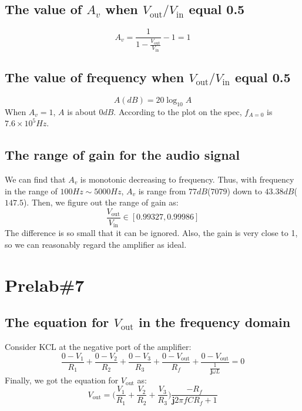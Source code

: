 \documentclass{IEEEtran}
\begin{document}
	\subsection{The value of $A_v$ when $V_{\mathrm{out}}/V_{\mathrm{in}}$ equal 0.5}
	\begin{equation}
		A_v = \frac{1}{1-\frac{V_{\mathrm{out}}}{V_{\mathrm{in}}}} - 1 = 1
	\end{equation}
	\subsection{The value of frequency when $V_{\mathrm{out}}/V_{\mathrm{in}}$ equal 0.5}
	\begin{equation}
		A(\si{dB}) = 20\log_{10}{A}
	\end{equation}
	\phantom{ } When $A_v=1$, $A$ is about $0\si{dB}$. According to the plot on the spec, $f_{A=0}$ is $7.6\times10^5\si{Hz}$.
	\subsection{The range of gain for the audio signal}
	We can find that $A_v$ is monotonic decreasing to frequency. Thus, with frequency in the range of $100\si{Hz}\sim5000\si{Hz}$, $A_v$ is range from $77\si{dB}$($7079$) down to $43.38\si{dB}$($147.5$). Then, we figure out the range of gain as:
	\begin{equation}
		\frac{V_{\mathrm{out}}}{V_{\mathrm{in}}} \in [0.99327, 0.99986]
	\end{equation}
	The difference is so small that it can be ignored. Also, the gain is very close to 1, so we can reasonably regard the amplifier as ideal.
	
	\section{\textbf{Prelab\#7}}
	\subsection{The equation for $V_{\mathrm{out}}$ in the frequency domain}
	Consider KCL at the negative port of the amplifier:
	\begin{equation}
		\frac{0-V_1}{R_1} + \frac{0-V_2}{R_2} + \frac{0-V_3}{R_3} + \frac{0-V_{\mathrm{out}}}{R_f} + \frac{0-V_{\mathrm{out}}}{\frac{1}{\mathbf{j}\omega L}} = 0
	\end{equation}
	Finally, we got the equation for $V_{\mathrm{out}}$ as:
	\begin{equation}
		V_{\mathrm{out}} = \bigg(\frac{V_1}{R_1} + \frac{V_2}{R_2} + \frac{V_3}{R_3}\bigg) \frac{-R_f}{\mathbf{j}2\pi fCR_f+1}
	\end{equation}
\end{document}
